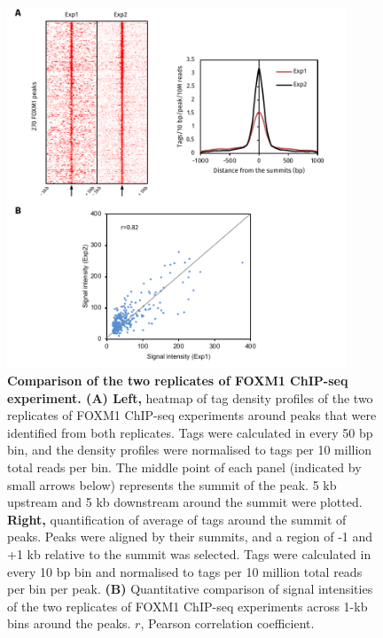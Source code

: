 \begin{figure}[!h]
    \centering
    \includegraphics[width=0.9\textwidth]{chapter3/figures_overview/fig12.pdf}
    \caption[Comparison of the two replicates of FOXM1 ChIP-seq experiment]{\textbf{Comparison of the two replicates of FOXM1 ChIP-seq experiment. (A) Left,} heatmap of tag density profiles of the two replicates of FOXM1 ChIP-seq experiments around peaks that were identified from both replicates. Tags were calculated in every 50 bp bin, and the density profiles were normalised to tags per 10 million total reads per bin. The middle point of each panel (indicated by small arrows below) represents the summit of the peak. 5 kb upstream and 5 kb downstream around the summit were plotted. \textbf{Right,} quantification of average of tags around the summit of peaks. Peaks were aligned by their summits, and a region of -1 and +1 kb relative to the summit was selected. Tags were calculated in every 10 bp bin and normalised to tags per 10 million total reads per bin per peak. \textbf{(B)} Quantitative comparison of signal intensities of the two replicates of FOXM1 ChIP-seq experiments across 1-kb bins around the peaks. $r$, Pearson correlation coefficient.}
    \label{fig:fig12}
\end{figure}

